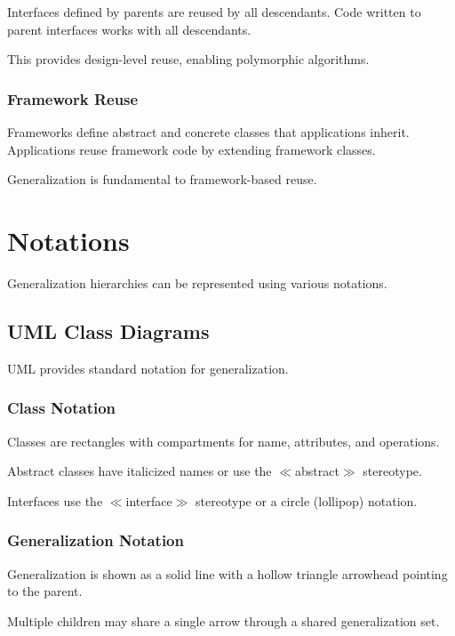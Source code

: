 \documentclass[11pt]{article}
\begin{document}
Interfaces defined by parents are reused by all descendants. Code written to parent interfaces works with all descendants.

This provides design-level reuse, enabling polymorphic algorithms.

\subsubsection{Framework Reuse}

Frameworks define abstract and concrete classes that applications inherit. Applications reuse framework code by extending framework classes.

Generalization is fundamental to framework-based reuse.

\section{Notations}

Generalization hierarchies can be represented using various notations.

\subsection{UML Class Diagrams}

UML provides standard notation for generalization.

\subsubsection{Class Notation}

Classes are rectangles with compartments for name, attributes, and operations.

Abstract classes have italicized names or use the $\ll$abstract$\gg$ stereotype.

Interfaces use the $\ll$interface$\gg$ stereotype or a circle (lollipop) notation.

\subsubsection{Generalization Notation}

Generalization is shown as a solid line with a hollow triangle arrowhead pointing to the parent.

Multiple children may share a single arrow through a shared generalization set.
\end{document}
